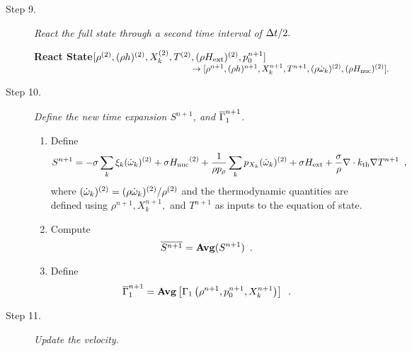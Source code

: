 \begin{description}
\begin{enumerate}
\end{enumerate}

\item[Step 9.] {\em React the full state through a second time interval of $\Delta t / 2.$}

{\bf React State}$[\rho^{(2)},(\rho h)^{(2)}, X_k^{(2)},T^{(2)}, (\rho{H_{\rm ext}})^{(2)}, p_0^{n+1}]$\\
$~~~~~~~~~~~~~~~~~~~~~~~~~~~~~~~~~~~~~~~~~~~~~~~~~~~~~~\rightarrow [\rho^{n+1}, 
(\rho h)^{n+1}, X_k^{n+1}, T^{n+1}, (\rho \dot{\omega}_k)^{(2)}, (\rho {H_{\rm nuc}})^{(2)} ].$  


\item[Step 10.] {\em Define the new time expansion $S^{n+1}$, and $\overline{\Gamma}_1^{n+1}$.}

\begin{enumerate}
\renewcommand{\theenumi}{{\bf \alph{enumi}}}
\item Define
\begin{equation}
  S^{n+1} =  -\sigma  \sum_k  \xi_k (\dot{\omega}_k)^{(2)}  + \sigma {H_{\rm nuc}}^{(2)} +
  \frac{1}{\rho p_\rho} \sum_k p_{X_k}  ({\dot{\omega}}_k)^{(2)}  
   + \sigma {H_{\rm ext}} + \frac{\sigma}{\rho}\nabla\cdot k_{\rm th}\nabla T^{n+1} \enskip ,
\end{equation}
where $(\dot{\omega}_k)^{(2)} = (\rho \dot{\omega}_k)^{(2)} / \rho^{(2)}$
and the thermodynamic quantities are defined using $\rho^{n+1}, X_k^{n+1},$
and $T^{n+1}$ as inputs to the equation of state.

\item Compute
\begin{equation}
\overline{S^{n+1}} = {\mathrm{\bf Avg}} (S^{n+1}) \enskip.
\end{equation}

\item Define
\begin{equation}
 \overline{\Gamma}_1^{n+1} = {\rm{\bf Avg}}\left[\Gamma_1\left(\rho^{n+1}, p_0^{n+1}, 
X_k^{n+1}\right) \right] \enskip .
\end{equation}

\end{enumerate}


\item[Step 11.] {\em Update the velocity}.  


\end{description}
